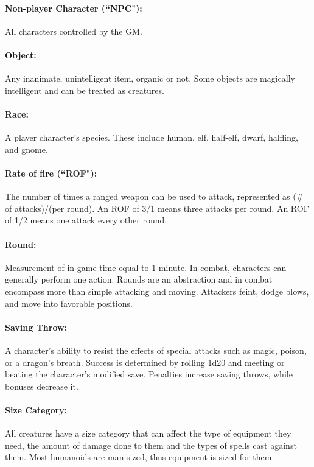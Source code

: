 \begin{multicols}{2}
\paragraph{Non-player Character (``NPC"):} All characters controlled by the GM.

\paragraph{Object:} Any inanimate, unintelligent item, organic or not.  Some objects are magically intelligent and can be treated as creatures.

\paragraph{Race:} A player character's species. These include human, elf, half-elf, dwarf, halfling, and gnome.

\paragraph{Rate of fire (``ROF"):} The number of times a ranged weapon can be used to attack, represented as (\# of attacks)/(per round).  An ROF of 3/1 means three attacks per round.  An ROF of 1/2 means one attack every other round.

\paragraph{Round:} Measurement of in-game time equal to 1 minute.  In combat, characters can generally perform one action.  Rounds are an abstraction and in combat encompass more than simple attacking and moving.  Attackers feint, dodge blows, and move into favorable positions.

\paragraph{Saving Throw:} A character's ability to resist the effects of special attacks such as magic, poison, or a dragon's breath.  Success is determined by rolling 1d20 and meeting or beating the character's modified save.  Penalties increase saving throws, while bonuses decrease it.
 
\paragraph{Size Category:} All creatures have a size category that can affect the type of equipment they need, the amount of damage done to them and the types of spells cast against them.  Most humanoids are man-sized, thus equipment is sized for them.


\end{multicols}
